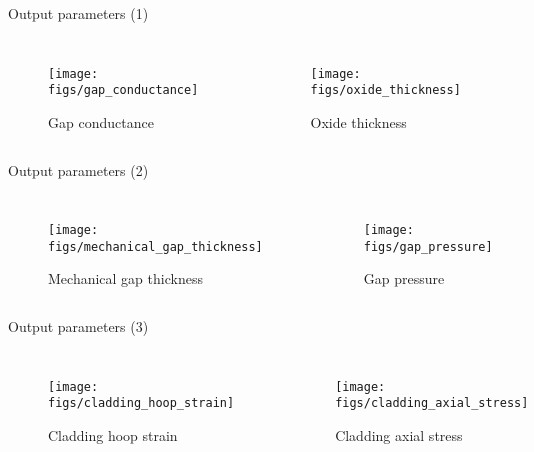 \documentclass[11pt]{beamer}
\begin{document}
\begin{frame}{Output parameters (1)}
  \footnotesize 
  
  \begin{columns}[t]


  \begin{figure}[h]
    \texttt{[image: figs/gap\_conductance]}
    \caption{Gap conductance}
    \label{fig:conduct}    
  \end{figure}  


  \begin{figure}[h]
    \texttt{[image: figs/oxide\_thickness]}    
    \caption{Oxide thickness}
    \label{fig:oxide}
  \end{figure}  
  
  \end{columns}

\end{frame}


\begin{frame}{Output parameters (2)}
  \footnotesize 
  
  \begin{columns}[t]


  \begin{figure}[h]
    \texttt{[image: figs/mechanical\_gap\_thickness]}
    \caption{Mechanical gap thickness}
  \end{figure}  


  \begin{figure}[h]
    \texttt{[image: figs/gap\_pressure]}    
    \caption{Gap pressure}
  \end{figure}  
  
  \end{columns}

\end{frame}

\begin{frame}{Output parameters (3)}
  \footnotesize 
  
  \begin{columns}[t]


  \begin{figure}[h]
    \texttt{[image: figs/cladding\_hoop\_strain]}
    \caption{Cladding hoop strain}
  \end{figure}  


  \begin{figure}[h]
    \texttt{[image: figs/cladding\_axial\_stress]}    
    \caption{Cladding axial stress}
  \end{figure}  
  
  \end{columns}

\end{frame}
\end{document}
